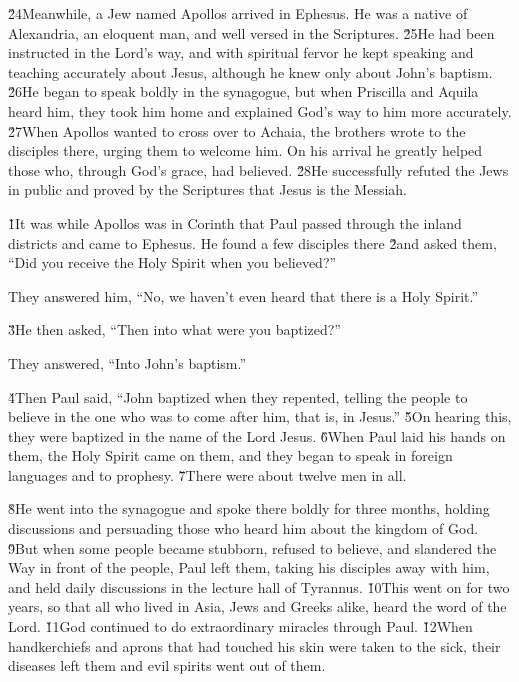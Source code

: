 \v{24}Meanwhile, a Jew named Apollos arrived in Ephesus. He was a native of Alexandria, an eloquent man, and well versed in the Scriptures. \v{25}He had been instructed in the Lord's way, and with spiritual fervor he kept speaking and teaching accurately about Jesus, although he knew only about John's baptism. \v{26}He began to speak boldly in the synagogue, but when Priscilla and Aquila heard him, they took him home and explained God's way to him more accurately. \v{27}When Apollos wanted to cross over to Achaia, the brothers wrote to the disciples there, urging them to welcome him. On his arrival he greatly helped those who, through God's grace, had believed. \v{28}He successfully refuted the Jews in public and proved by the Scriptures that Jesus is the Messiah.

\v{1}It was while Apollos was in Corinth that Paul passed through the inland districts and came to Ephesus. He found a few disciples there \v{2}and asked them, ``Did you receive the Holy Spirit when you believed?''

They answered him, ``No, we haven't even heard that there is a Holy Spirit.''

\v{3}He then asked, ``Then into what were you baptized?''

They answered, ``Into John's baptism.''

\v{4}Then Paul said, ``John baptized when they repented, telling the people to believe in the one who was to come after him, that is, in Jesus.'' \v{5}On hearing this, they were baptized in the name of the Lord Jesus. \v{6}When Paul laid his hands on them, the Holy Spirit came on them, and they began to speak in foreign languages and to prophesy. \v{7}There were about twelve men in all.

\v{8}He went into the synagogue and spoke there boldly for three months, holding discussions and persuading those who heard him about the kingdom of God. \v{9}But when some people became stubborn, refused to believe, and slandered the Way in front of the people, Paul left them, taking his disciples away with him, and held daily discussions in the lecture hall of Tyrannus. \v{10}This went on for two years, so that all who lived in Asia, Jews and Greeks alike, heard the word of the Lord. \v{11}God continued to do extraordinary miracles through Paul. \v{12}When handkerchiefs and aprons that had touched his skin were taken to the sick, their diseases left them and evil spirits went out of them.

